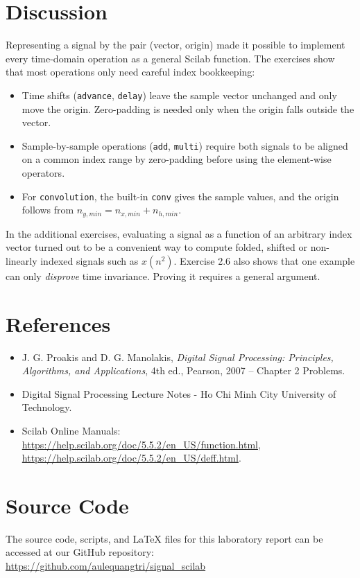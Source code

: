 \documentclass[12pt,a4paper]{article}
\begin{document}
\section{Discussion}
Representing a signal by the pair (vector, origin) made it possible to implement every time-domain operation as a general Scilab function. The exercises show that most operations only need careful index bookkeeping:
\begin{itemize}
    \item Time shifts (\texttt{advance}, \texttt{delay}) leave the sample vector unchanged and only move the origin. Zero-padding is needed only when the origin falls outside the vector.
    \item Sample-by-sample operations (\texttt{add}, \texttt{multi}) require both signals to be aligned on a common index range by zero-padding before using the element-wise operators.
    \item For \texttt{convolution}, the built-in \texttt{conv} gives the sample values, and the origin follows from $n_{y,min} = n_{x,min} + n_{h,min}$.
\end{itemize}
In the additional exercises, evaluating a signal as a function of an arbitrary index vector turned out to be a convenient way to compute folded, shifted or non-linearly indexed signals such as $x(n^2)$. Exercise 2.6 also shows that one example can only \emph{disprove} time invariance. Proving it requires a general argument.

\section{References}
\begin{itemize}
    \item J. G. Proakis and D. G. Manolakis, \emph{Digital Signal Processing: Principles, Algorithms, and Applications}, 4th ed., Pearson, 2007 -- Chapter 2 Problems.
    \item Digital Signal Processing Lecture Notes - Ho Chi Minh City University of Technology.
    \item Scilab Online Manuals: \url{https://help.scilab.org/doc/5.5.2/en_US/function.html}, \url{https://help.scilab.org/doc/5.5.2/en_US/deff.html}.
\end{itemize}

\section{Source Code}
The source code, scripts, and LaTeX files for this laboratory report can be accessed at our GitHub repository: \\
\url{https://github.com/aulequangtri/signal_scilab}
\end{document}

